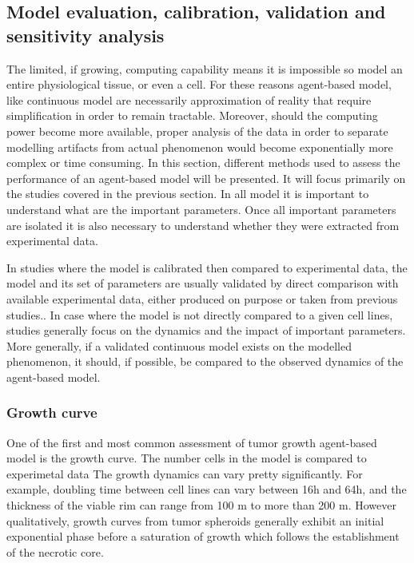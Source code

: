 \documentclass[11pt,a4paper]{article}
\begin{document}
\subsection{Model evaluation, calibration, validation and sensitivity analysis}
The limited, if growing, computing capability means it is impossible so model an entire physiological tissue, or even a cell. For these reasons agent-based model, like continuous model are necessarily approximation of reality that require  simplification in order to remain tractable. Moreover, should the computing power become more available, proper analysis of the data in order to separate modelling artifacts from actual phenomenon would become exponentially more complex or time consuming. In this section, different methods used to assess the performance of an agent-based model will be presented. It will focus primarily on the studies covered in the previous section. In all model it is important to understand what are the important parameters. Once all important parameters are isolated it is also necessary to understand whether they were extracted from experimental data.

In studies where the model is calibrated then compared to experimental data, the model and its set of parameters are usually validated by direct comparison with available experimental data, either produced on purpose or taken from previous studies.\cite{Arrebola2020}\cite{Kempf2010}\cite{Hamis2020}\cite{Mao2018}\cite{Jagiella2016}\cite{Ghaffarizadeh2017}. In case where the model is not directly compared to a given cell lines, studies generally focus on the dynamics and the impact of important parameters.\cite{Cleri2019}\cite{Bull2020} More generally, if a validated continuous model exists on the modelled phenomenon, it should, if possible, be compared to the observed dynamics of the agent-based model. 

\subsubsection{Growth curve}
One of the first and most common assessment of tumor growth agent-based model is the growth curve. The number cells in the model is compared to experimetal data The growth dynamics can vary pretty significantly. For example, doubling time between cell lines can vary between 16h and 64h, and the thickness of the viable rim can range from 100 \textmu m to more than 200 \textmu m.\cite{Freyer1988} However qualitatively, growth curves from tumor spheroids generally exhibit an initial exponential phase before a saturation of growth which follows the establishment of the necrotic core. 
\end{document}
